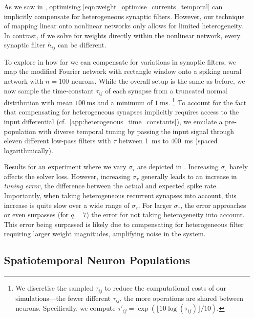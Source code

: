 As we saw in , optimising \cref{eqn:weight_optimise_currents_temporal} can implicitly compensate for heterogeneous synaptic filters.
However, our technique of mapping linear onto nonlinear networks only allows for limited heterogeneity.
In contrast, if we solve for weights directly within the nonlinear network, every synaptic filter $h_{ij}$ can be different.

To explore in how far we can compensate for variations in synaptic filters, we map the modified Fourier network with rectangle window onto a spiking neural network with $n = 100$ neurons.
While the overall setup is the same as before, we now sample the time-constant $\tau_{ij}$ of each synapse from a truncated normal distribution with mean $\SI{100}{\milli\second}$ and a minimum of $\SI{1}{\milli\second}$.%
\footnote{We discretise the sampled $\tau_{ij}$ to reduce the computational costs of our simulations---the fewer different $\tau_{ij}$, the more operations are shared between neurons.
Specifically, we compute $\tau'_{ij} = \exp(\lfloor 10 \log(\tau_{ij}) \rfloor / 10)$.
}
To account for the fact that compensating for heterogeneous synapses implicitly requires access to the input differential (cf.~\cref{app:heterogenous_time_constants}), we emulate a pre-population with diverse temporal tuning by passing the input signal through eleven different low-pass filters with $\tau$ between \SI{1}{\milli\second} to \SI{400}{\milli\second} (spaced logarithmically).

Results for an experiment where we vary $\sigma_\tau$ are depicted in .
Increasing $\sigma_\tau$ barely affects the solver loss.
However, increasing $\sigma_\tau$ generally leads to an increase in \emph{tuning error}, the difference between the actual and expected spike rate.
Importantly, when taking heterogeneous recurrent synapses into account, this increase is quite slow over a wide range of $\sigma_\tau$.
For larger $\sigma_\tau$, the error approaches or even surpasses (for $q = 7$) the error for not taking heterogeneity into account.
This error being surpassed is likely due to compensating for heterogeneous filter requiring larger weight magnitudes, amplifying noise in the system.

\subsection{Spatiotemporal Neuron Populations}
\label{sec:spatiotemporal}

